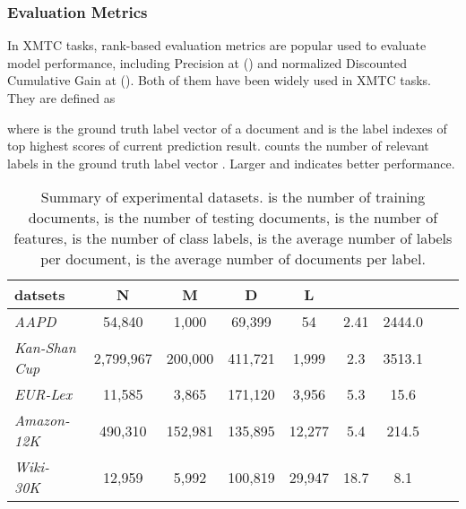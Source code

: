 \documentclass[runningheads]{llncs}
\begin{document}
\vspace{-4mm}
\subsubsection{Evaluation Metrics}
In XMTC tasks, 
rank-based evaluation metrics are popular used to evaluate model performance, including Precision at  () and normalized Discounted Cumulative Gain at  (). Both of them have been widely used in XMTC tasks. They are defined as 

where  is the ground truth label vector of a document and  is the label indexes of top  highest scores of current prediction result.
 counts the number of relevant labels in the ground truth label vector . Larger  and  indicates better performance.
\vspace{-4mm}
\begin{table}[tbp]
\renewcommand\tabcolsep{4.0pt}
\footnotesize
\centering
\caption{Summary of experimental datasets.  is the number of training documents,  is the number of testing documents,  is the number of features,  is the number of class labels,  is the average number of labels per document,  is the average number of documents per label.}\label{table1}
\begin{tabular}{lcccccccc}
	\hline
	datsets &  N & M& D& L& &\\
	\hline
	\textit{AAPD}~\cite{ref_article2} &  54,840 & 1,000 & 69,399 & 54 & 2.41 & 2444.0\\
\textit{Kan-Shan Cup}~\footnotemark[2] &  2,799,967 & 200,000& 411,721 & 1,999& 2.3  & 3513.1  \\
	\textit{EUR-Lex}~\cite{ref_article3} &  11,585 & 3,865&  171,120&  3,956&  5.3&  15.6\\
	\textit{Amazon-12K}~\cite{ref_article5} &  490,310 & 152,981&  135,895&  12,277&  5.4&  214.5\\
	\textit{Wiki-30K}~\cite{ref_article4} &  12,959 & 5,992&  100,819&  29,947&  18.7&  8.1\\
\hline
\end{tabular}
\end{table}
\end{document}
